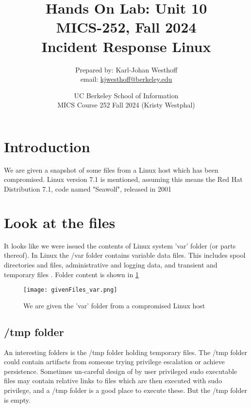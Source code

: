 \documentclass[
	letterpaper, %
	10pt, %
	unnumberedsections, %
	twoside, %
]{APAAssignment}
\title{Hands On Lab: Unit 10 \\ MICS-252, Fall 2024 \\ Incident Response Linux} %
\date{UC Berkeley School of Information \\
MICS Course 252 Fall 2024 (Kristy Westphal)
}
\author{
	Prepared by: Karl-Johan Westhoff \\
	email: \href{mailto:kjwesthoff@berkeley.edu}{kjwesthoff@berkeley.edu}
}
\begin{document}
\onecolumn
\maketitle %



\section{Introduction}
We are given a snapshot of some files from a Linux host which has been compromised.
Linux version 7.1 is mentioned, assuming this means the Red Hat Distribution 7.1, code named "Seawolf", released in 2001 \cite{RedHatOnWIki}







\section{Look at the files}
It looks like we were issued the contents of Linux system 'var' folder (or parts thereof). In Linux the /var folder contains variable data files. This includes spool directories and files, administrative and logging data, and transient and temporary files \cite{VarFolder}. Folder content is shown in \ref{fig:givenFiles}

\begin{figure}[!htp] %
	\centering
	\texttt{[image: givenFiles\_var.png]}
	\caption{We are given the 'var' folder from a compromised Linux host}
	\label{fig:givenFiles}
\end{figure}

\subsection{/tmp folder}
An interesting folders is the /tmp folder holding temporary files. The /tmp folder could contain artifacts from someone trying privilege escalation or achieve persistence. Sometimes un-careful design of by user privileged sudo executable files may contain relative links to files which are then executed with sudo privilege, and a /tmp folder is a good place to execute these. But the /tmp folder is empty.
\end{document}

